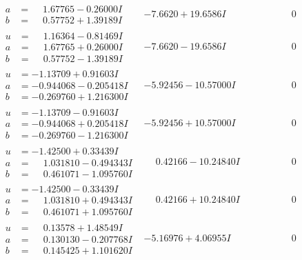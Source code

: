 \documentclass[1p]{elsarticle_modified}
\theoremstyle{definition}
\begin{document}
$$\begin{array}{c|c|c}
\begin{aligned}
a &= \phantom{-}1.67765 - 0.26000 I \\
b &= \phantom{-}0.57752 + 1.39189 I\end{aligned}
 & -7.6620 + 19.6586 I & \phantom{-0.000000 } 0 \\ \hline\begin{aligned}
u &= \phantom{-}1.16364 - 0.81469 I \\
a &= \phantom{-}1.67765 + 0.26000 I \\
b &= \phantom{-}0.57752 - 1.39189 I\end{aligned}
 & -7.6620 - 19.6586 I & \phantom{-0.000000 } 0 \\ \hline\begin{aligned}
u &= -1.13709 + 0.91603 I \\
a &= -0.944068 - 0.205418 I \\
b &= -0.269760 + 1.216300 I\end{aligned}
 & -5.92456 - 10.57000 I & \phantom{-0.000000 } 0 \\ \hline\begin{aligned}
u &= -1.13709 - 0.91603 I \\
a &= -0.944068 + 0.205418 I \\
b &= -0.269760 - 1.216300 I\end{aligned}
 & -5.92456 + 10.57000 I & \phantom{-0.000000 } 0 \\ \hline\begin{aligned}
u &= -1.42500 + 0.33439 I \\
a &= \phantom{-}1.031810 - 0.494343 I \\
b &= \phantom{-}0.461071 - 1.095760 I\end{aligned}
 & \phantom{-}0.42166 - 10.24840 I & \phantom{-0.000000 } 0 \\ \hline\begin{aligned}
u &= -1.42500 - 0.33439 I \\
a &= \phantom{-}1.031810 + 0.494343 I \\
b &= \phantom{-}0.461071 + 1.095760 I\end{aligned}
 & \phantom{-}0.42166 + 10.24840 I & \phantom{-0.000000 } 0 \\ \hline\begin{aligned}
u &= \phantom{-}0.13578 + 1.48549 I \\
a &= \phantom{-}0.130130 - 0.207768 I \\
b &= \phantom{-}0.145425 + 1.101620 I\end{aligned}
 & -5.16976 + 4.06955 I & \phantom{-0.000000 } 0 \\ \hline\begin{aligned}

\end{aligned}
\end{array}$$
\end{document}

